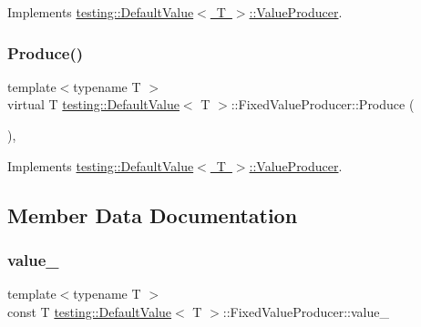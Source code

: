 Implements \mbox{\hyperlink{classtesting_1_1_default_value_1_1_value_producer_adb9e38abe068ac2e792b53fd32bd7e96}{testing\+::\+Default\+Value$<$ T $>$\+::\+Value\+Producer}}.

\mbox{\label{classtesting_1_1_default_value_1_1_fixed_value_producer_ad7f695192e9dbc5f54cdb405655e7125}} 
\subsubsection{\texorpdfstring{Produce()}{Produce()}\hspace{0.1cm}{\footnotesize\ttfamily [3/3]}}
{\footnotesize\ttfamily template$<$typename T $>$ \\
virtual T \mbox{\hyperlink{classtesting_1_1_default_value}{testing\+::\+Default\+Value}}$<$ T $>$\+::Fixed\+Value\+Producer\+::\+Produce (\begin{DoxyParamCaption}{ }\end{DoxyParamCaption})\hspace{0.3cm}{\ttfamily [inline]}, {\ttfamily [virtual]}}



Implements \mbox{\hyperlink{classtesting_1_1_default_value_1_1_value_producer_adb9e38abe068ac2e792b53fd32bd7e96}{testing\+::\+Default\+Value$<$ T $>$\+::\+Value\+Producer}}.



\subsection{Member Data Documentation}
\mbox{\label{classtesting_1_1_default_value_1_1_fixed_value_producer_a54b7bf74121bd34319ebbe80e1aaa190}} 
\subsubsection{\texorpdfstring{value\_}{value\_}}
{\footnotesize\ttfamily template$<$typename T $>$ \\
const T \mbox{\hyperlink{classtesting_1_1_default_value}{testing\+::\+Default\+Value}}$<$ T $>$\+::Fixed\+Value\+Producer\+::value\+\_\+\hspace{0.3cm}{\ttfamily [private]}}



